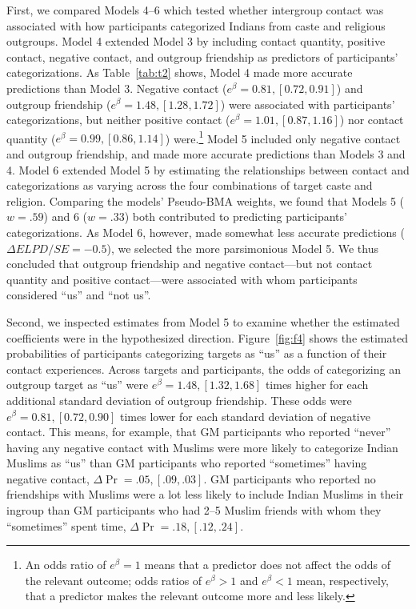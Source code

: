 \documentclass[12pt, a4paper]{article}
\begin{document}
First, we compared Models 4--6 which tested whether intergroup contact was associated with how participants categorized Indians from caste and religious outgroups. Model 4 extended Model 3 by including contact quantity, positive contact, negative contact, and outgroup friendship as predictors of participants’ categorizations. As Table~\ref{tab:t2} shows, Model 4 made more accurate predictions than Model 3. Negative contact ($e^\beta = 0.81, [0.72, 0.91]$) and outgroup friendship ($e^\beta = 1.48, [1.28, 1.72]$) were associated with participants’ categorizations, but neither positive contact ($e^\beta = 1.01, [0.87, 1.16]$) nor contact quantity ($e^\beta = 0.99, [0.86, 1.14]$) were.\footnote{An odds ratio of $e^\beta = 1$ means that a predictor does not affect the odds of the relevant outcome; odds ratios of $e^\beta > 1$ and $e^\beta < 1$ mean, respectively, that a predictor makes the relevant outcome more and less likely.} Model 5 included only negative contact and outgroup friendship, and made more accurate predictions than Models 3 and 4. Model 6 extended Model 5 by estimating the relationships between contact and categorizations as varying across the four combinations of target caste and religion. Comparing the models’ Pseudo-BMA weights, we found that Models 5 ($w = .59$) and 6 ($w = .33$) both contributed to predicting participants’ categorizations. As Model 6, however, made somewhat less accurate predictions ($\Delta\textit{ELPD}/\textit{SE} = -0.5$), we selected the more parsimonious Model 5. We thus concluded that outgroup friendship and negative contact---but not contact quantity and positive contact---were associated with whom participants considered “us” and “not us”.

Second, we inspected estimates from Model 5 to examine whether the estimated coefficients were in the hypothesized direction. Figure~\ref{fig:f4} shows the estimated probabilities of participants categorizing targets as “us” as a function of their contact experiences. Across targets and participants, the odds of categorizing an outgroup target as “us” were $e^\beta = 1.48, [1.32, 1.68]$ times higher for each additional standard deviation of outgroup friendship. These odds were $e^\beta = 0.81, [0.72, 0.90]$ times lower for each standard deviation of negative contact. This means, for example, that GM participants who reported “never” having any negative contact with Muslims were more likely to categorize Indian Muslims as “us” than GM participants who reported “sometimes” having negative contact, $\Delta\Pr = .05, [.09, .03]$. GM participants who reported no friendships with Muslims were a lot less likely to include Indian Muslims in their ingroup than GM participants who had 2--5 Muslim friends with whom they “sometimes” spent time, $\Delta\Pr = .18, [.12, .24]$. 
\end{document}
